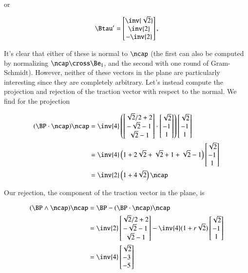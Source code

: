 \begin{Answer}[ref={problem:continuumProblemSet1:q3}]
or

\begin{equation}\label{eqn:continuumProblemSet1:470}
\Btau' = 
\begin{bmatrix}
\inv{\sqrt{2}} \\
\inv{2} \\
-\inv{2}
\end{bmatrix},
\end{equation}

It's clear that either of these is normal to $\ncap$ (the first can also be computed by normalizing $\ncap \cross \Be_1$, and the second with one round of Gram-Schmidt).  However, neither of these vectors in the plane are particularly interesting since they are completely arbitrary.  Let's instead compute the projection and rejection of the traction vector with respect to the normal.  We find for the projection

\begin{align*}
(\BP \cdot \ncap) \ncap
&=
\inv{4}
\left(
\begin{bmatrix}
\sqrt{2}/2 + 2 \\
-\sqrt{2} -1 \\
\sqrt{2} - 1
\end{bmatrix}
\cdot 
\begin{bmatrix}
\sqrt{2} \\
-1 \\
1
\end{bmatrix} 
\right)
\begin{bmatrix}
\sqrt{2} \\
-1 \\
1
\end{bmatrix}  \\
&=
\inv{4}
\left( 
1 + 2\sqrt{2}
+\sqrt{2} +1 
+\sqrt{2} - 1
\right)
\begin{bmatrix}
\sqrt{2} \\
-1 \\
1
\end{bmatrix}  \\
&=
\inv{2}
\left( 
1 + 4\sqrt{2}
\right)
\ncap
\end{align*}

Our rejection, the component of the traction vector in the plane, is

\begin{align*}
(\BP \wedge \ncap) \ncap 
&=
\BP - (\BP \cdot \ncap)\ncap \\
&=
\inv{2}
\begin{bmatrix}
\sqrt{2}/2 + 2 \\
-\sqrt{2} -1 \\
\sqrt{2} - 1
\end{bmatrix}
-\inv{4}(1 + r \sqrt{2})
\begin{bmatrix}
\sqrt{2} \\
-1 \\
1
\end{bmatrix} \\
&=
\inv{4}
\begin{bmatrix}
\sqrt{2} \\
-3 \\
-5
\end{bmatrix}
\end{align*}


\end{Answer}
